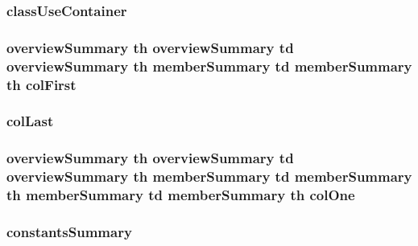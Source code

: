 \hypertarget{stylesheet_8css_a11ae13744beabb797e5de77e39a0bcaa}{
\subsubsection[{class\-Use\-Container}]{\setlength{\rightskip}{0pt plus 5cm}class\-Use\-Container}}\label{stylesheet_8css_a11ae13744beabb797e5de77e39a0bcaa}
\hypertarget{stylesheet_8css_ae2ebec9f786cbb430996cc1732d80147}{
\subsubsection[{col\-First}]{\setlength{\rightskip}{0pt plus 5cm}overview\-Summary {\bf th} overview\-Summary {\bf td} overview\-Summary {\bf th} {\bf member\-Summary} {\bf td} {\bf member\-Summary} {\bf th} col\-First}}\label{stylesheet_8css_ae2ebec9f786cbb430996cc1732d80147}
\hypertarget{stylesheet_8css_a4f54b1156bb061d2779b37a31516377b}{
\subsubsection[{col\-Last}]{ col\-Last}}\label{stylesheet_8css_a4f54b1156bb061d2779b37a31516377b}
\hypertarget{stylesheet_8css_a0412eaef6905f4900725fb034b78630d}{
\subsubsection[{col\-One}]{\setlength{\rightskip}{0pt plus 5cm}overview\-Summary {\bf th} overview\-Summary {\bf td} overview\-Summary {\bf th} {\bf member\-Summary} {\bf td} {\bf member\-Summary} {\bf th} {\bf member\-Summary} {\bf td} {\bf member\-Summary} {\bf th} col\-One}}\label{stylesheet_8css_a0412eaef6905f4900725fb034b78630d}
\hypertarget{stylesheet_8css_a3ce71a96972527d2fbc3952e35a54f20}{
\subsubsection[{constants\-Summary}]{\setlength{\rightskip}{0pt plus 5cm}constants\-Summary}}\label{stylesheet_8css_a3ce71a96972527d2fbc3952e35a54f20}
